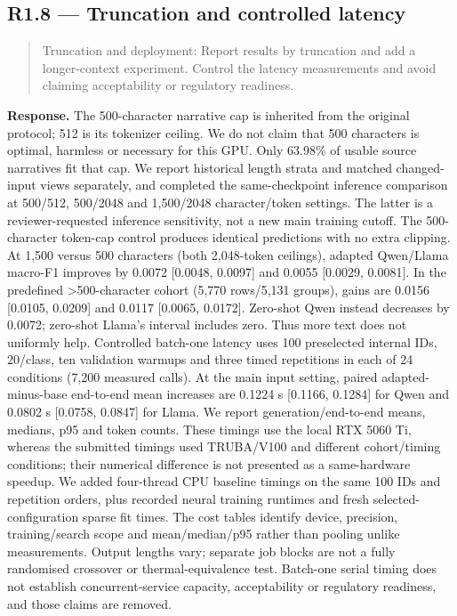 \documentclass[11pt,a4paper]{article}
\begin{document}
\subsection*{R1.8 — Truncation and controlled latency}
\begin{quote}\small Truncation and deployment: Report results by truncation and add a longer-context experiment. Control the latency measurements and avoid claiming acceptability or regulatory readiness.\end{quote}
\textbf{Response.} The 500-character narrative cap is inherited from the original protocol; 512 is its tokenizer ceiling. We do not claim that 500 characters is optimal, harmless or necessary for this GPU. Only 63.98\% of usable source narratives fit that cap. We report historical length strata and matched changed-input views separately, and completed the same-checkpoint inference comparison at 500/512, 500/2048 and 1,500/2048 character/token settings. The latter is a reviewer-requested inference sensitivity, not a new main training cutoff. The 500-character token-cap control produces identical predictions with no extra clipping. At 1,500 versus 500 characters (both 2,048-token ceilings), adapted Qwen/Llama macro-F1 improves by 0.0072 [0.0048, 0.0097] and 0.0055 [0.0029, 0.0081]. In the predefined >500-character cohort (5,770 rows/5,131 groups), gains are 0.0156 [0.0105, 0.0209] and 0.0117 [0.0065, 0.0172]. Zero-shot Qwen instead decreases by 0.0072; zero-shot Llama's interval includes zero. Thus more text does not uniformly help. Controlled batch-one latency uses 100 preselected internal IDs, 20/class, ten validation warmups and three timed repetitions in each of 24 conditions (7,200 measured calls). At the main input setting, paired adapted-minus-base end-to-end mean increases are 0.1224 s [0.1166, 0.1284] for Qwen and 0.0802 s [0.0758, 0.0847] for Llama. We report generation/end-to-end means, medians, p95 and token counts. These timings use the local RTX 5060 Ti, whereas the submitted timings used TRUBA/V100 and different cohort/timing conditions; their numerical difference is not presented as a same-hardware speedup. We added four-thread CPU baseline timings on the same 100 IDs and repetition orders, plus recorded neural training runtimes and fresh selected-configuration sparse fit times. The cost tables identify device, precision, training/search scope and mean/median/p95 rather than pooling unlike measurements. Output lengths vary; separate job blocks are not a fully randomised crossover or thermal-equivalence test. Batch-one serial timing does not establish concurrent-service capacity, acceptability or regulatory readiness, and those claims are removed.
\end{document}
